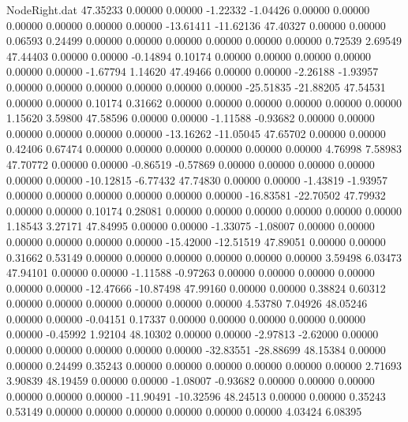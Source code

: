 \begin{filecontents}{NodeRight.dat}
  47.35233    0.00000    0.00000    -1.22332   -1.04426    0.00000    0.00000    0.00000    0.00000    0.00000    0.00000  -13.61411  -11.62136
  47.40327    0.00000    0.00000     0.06593    0.24499    0.00000    0.00000    0.00000    0.00000    0.00000    0.00000    0.72539    2.69549
  47.44403    0.00000    0.00000    -0.14894    0.10174    0.00000    0.00000    0.00000    0.00000    0.00000    0.00000   -1.67794    1.14620
  47.49466    0.00000    0.00000    -2.26188   -1.93957    0.00000    0.00000    0.00000    0.00000    0.00000    0.00000  -25.51835  -21.88205
  47.54531    0.00000    0.00000     0.10174    0.31662    0.00000    0.00000    0.00000    0.00000    0.00000    0.00000    1.15620    3.59800
  47.58596    0.00000    0.00000    -1.11588   -0.93682    0.00000    0.00000    0.00000    0.00000    0.00000    0.00000  -13.16262  -11.05045
  47.65702    0.00000    0.00000     0.42406    0.67474    0.00000    0.00000    0.00000    0.00000    0.00000    0.00000    4.76998    7.58983
  47.70772    0.00000    0.00000    -0.86519   -0.57869    0.00000    0.00000    0.00000    0.00000    0.00000    0.00000  -10.12815   -6.77432
  47.74830    0.00000    0.00000    -1.43819   -1.93957    0.00000    0.00000    0.00000    0.00000    0.00000    0.00000  -16.83581  -22.70502
  47.79932    0.00000    0.00000     0.10174    0.28081    0.00000    0.00000    0.00000    0.00000    0.00000    0.00000    1.18543    3.27171
  47.84995    0.00000    0.00000    -1.33075   -1.08007    0.00000    0.00000    0.00000    0.00000    0.00000    0.00000  -15.42000  -12.51519
  47.89051    0.00000    0.00000     0.31662    0.53149    0.00000    0.00000    0.00000    0.00000    0.00000    0.00000    3.59498    6.03473
  47.94101    0.00000    0.00000    -1.11588   -0.97263    0.00000    0.00000    0.00000    0.00000    0.00000    0.00000  -12.47666  -10.87498
  47.99160    0.00000    0.00000     0.38824    0.60312    0.00000    0.00000    0.00000    0.00000    0.00000    0.00000    4.53780    7.04926
  48.05246    0.00000    0.00000    -0.04151    0.17337    0.00000    0.00000    0.00000    0.00000    0.00000    0.00000   -0.45992    1.92104
  48.10302    0.00000    0.00000    -2.97813   -2.62000    0.00000    0.00000    0.00000    0.00000    0.00000    0.00000  -32.83551  -28.88699
  48.15384    0.00000    0.00000     0.24499    0.35243    0.00000    0.00000    0.00000    0.00000    0.00000    0.00000    2.71693    3.90839
  48.19459    0.00000    0.00000    -1.08007   -0.93682    0.00000    0.00000    0.00000    0.00000    0.00000    0.00000  -11.90491  -10.32596
  48.24513    0.00000    0.00000     0.35243    0.53149    0.00000    0.00000    0.00000    0.00000    0.00000    0.00000    4.03424    6.08395

\end{filecontents}
